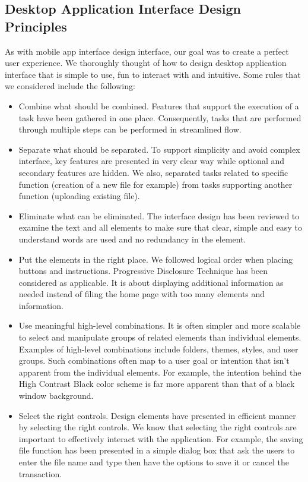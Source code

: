 \documentclass{article}
\begin{document}
\subsection{Desktop Application Interface Design Principles}
As with mobile app interface design interface, our goal was to create a perfect user experience. We thoroughly thought of how to design desktop application interface that is simple to use, fun to interact with and intuitive. Some rules that we considered include the following:
\begin{itemize}
\item Combine what should be combined. Features that support the execution of a task have been gathered in one place. Consequently, tasks that are performed through multiple steps can be performed in streamlined flow.
\item Separate what should be separated. To support simplicity and avoid complex interface, key features are presented in very clear way while optional and secondary features are hidden. We also, separated tasks related to specific function (creation of a new file for example) from tasks supporting another function (uploading existing file).
\item Eliminate what can be eliminated. The interface design has been reviewed to examine the text and all elements to make sure that clear, simple and easy to understand words are used and no redundancy in the element.
\item Put the elements in the right place. We followed logical order when placing buttons and instructions. Progressive Disclosure Technique has been considered as applicable. It is about displaying additional information as needed instead of filing the home page with too many elements and information.
\item Use meaningful high-level combinations. It is often simpler and more scalable to select and manipulate groups of related elements than individual elements. Examples of high-level combinations include folders, themes, styles, and user groups. Such combinations often map to a user goal or intention that isn't apparent from the individual elements. For example, the intention behind the High Contrast Black color scheme is far more apparent than that of a black window background.
\item Select the right controls. Design elements have presented in efficient manner by selecting the right controls. We know that selecting the right controls are important to effectively interact with the application. For example, the saving file function has been presented in a simple dialog box that ask the users to enter the file name and type then have the options to save it or cancel the transaction.
\end{itemize}
\end{document}
